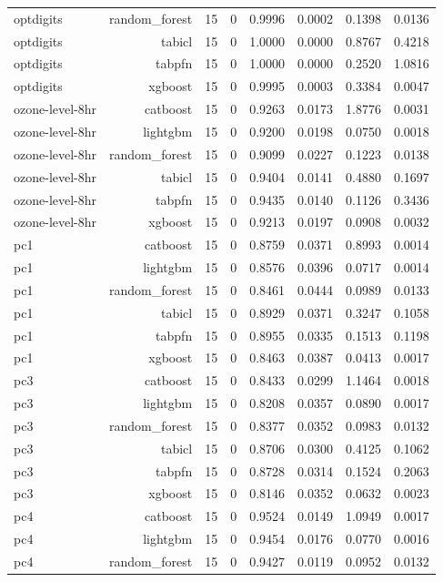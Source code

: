 \begin{table}[htbp]
\begin{tabular}{lrrrrrrr}
optdigits & random\_forest & 15 & 0 & 0.9996 & 0.0002 & 0.1398 & 0.0136 \\
optdigits & tabicl & 15 & 0 & 1.0000 & 0.0000 & 0.8767 & 0.4218 \\
optdigits & tabpfn & 15 & 0 & 1.0000 & 0.0000 & 0.2520 & 1.0816 \\
optdigits & xgboost & 15 & 0 & 0.9995 & 0.0003 & 0.3384 & 0.0047 \\
ozone-level-8hr & catboost & 15 & 0 & 0.9263 & 0.0173 & 1.8776 & 0.0031 \\
ozone-level-8hr & lightgbm & 15 & 0 & 0.9200 & 0.0198 & 0.0750 & 0.0018 \\
ozone-level-8hr & random\_forest & 15 & 0 & 0.9099 & 0.0227 & 0.1223 & 0.0138 \\
ozone-level-8hr & tabicl & 15 & 0 & 0.9404 & 0.0141 & 0.4880 & 0.1697 \\
ozone-level-8hr & tabpfn & 15 & 0 & 0.9435 & 0.0140 & 0.1126 & 0.3436 \\
ozone-level-8hr & xgboost & 15 & 0 & 0.9213 & 0.0197 & 0.0908 & 0.0032 \\
pc1 & catboost & 15 & 0 & 0.8759 & 0.0371 & 0.8993 & 0.0014 \\
pc1 & lightgbm & 15 & 0 & 0.8576 & 0.0396 & 0.0717 & 0.0014 \\
pc1 & random\_forest & 15 & 0 & 0.8461 & 0.0444 & 0.0989 & 0.0133 \\
pc1 & tabicl & 15 & 0 & 0.8929 & 0.0371 & 0.3247 & 0.1058 \\
pc1 & tabpfn & 15 & 0 & 0.8955 & 0.0335 & 0.1513 & 0.1198 \\
pc1 & xgboost & 15 & 0 & 0.8463 & 0.0387 & 0.0413 & 0.0017 \\
pc3 & catboost & 15 & 0 & 0.8433 & 0.0299 & 1.1464 & 0.0018 \\
pc3 & lightgbm & 15 & 0 & 0.8208 & 0.0357 & 0.0890 & 0.0017 \\
pc3 & random\_forest & 15 & 0 & 0.8377 & 0.0352 & 0.0983 & 0.0132 \\
pc3 & tabicl & 15 & 0 & 0.8706 & 0.0300 & 0.4125 & 0.1062 \\
pc3 & tabpfn & 15 & 0 & 0.8728 & 0.0314 & 0.1524 & 0.2063 \\
pc3 & xgboost & 15 & 0 & 0.8146 & 0.0352 & 0.0632 & 0.0023 \\
pc4 & catboost & 15 & 0 & 0.9524 & 0.0149 & 1.0949 & 0.0017 \\
pc4 & lightgbm & 15 & 0 & 0.9454 & 0.0176 & 0.0770 & 0.0016 \\
pc4 & random\_forest & 15 & 0 & 0.9427 & 0.0119 & 0.0952 & 0.0132 \\

\end{tabular}
\end{table}
